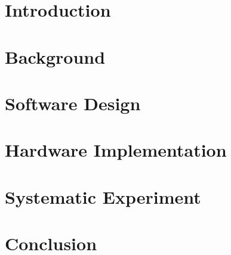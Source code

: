 \chapter{Introduction}


\chapter{Background}


\chapter{Software Design}


\chapter{Hardware Implementation}


\chapter{Systematic Experiment}


\chapter{Conclusion}
